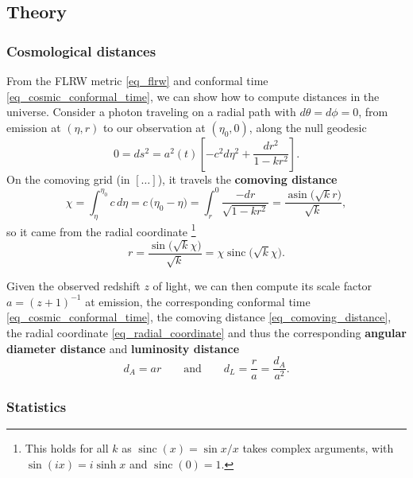 \documentclass[10pt,a4paper]{article}
\DeclareMathOperator{\asin}{asin}
\DeclareMathOperator{\sinc}{sinc}
\begin{document}
\subsection{Theory}

\subsubsection*{Cosmological distances}

From the FLRW metric \eqref{eq_flrw} and conformal time \eqref{eq_cosmic_conformal_time},
we can show how to compute distances in the universe.
Consider a photon traveling on a radial path with $d\theta = d\phi = 0$,
from emission at $(\eta,r)$ to our observation at $(\eta_0, 0)$,
along the null geodesic
\begin{equation*}
	0 = ds^2 = a^2(t) \left[ -c^2 d\eta^2 + \frac{dr^2}{1-kr^2} \right].
\end{equation*}
On the comoving grid (in $[\ldots]$), it travels the \textbf{comoving distance}
\begin{equation}
	\chi = \int_{\eta}^{\eta_0} c \, d\eta = c \, \big(\eta_0 - \eta\big) = \int_r^0 \frac{-dr}{\sqrt{1-kr^2}} = \frac{\asin\big(\sqrt{k}r\big)}{\sqrt{k}},
\label{eq_comoving_distance}
\end{equation}
so it came from the radial coordinate%
\footnote{This holds for all $k$ as $\sinc(x) = \sin x / x$ takes complex arguments, with $\sin(ix) = i \sinh x$ and $\sinc(0) = 1$.}
\begin{equation}
	r = \frac{\sin\Big(\sqrt{k}\chi\Big)}{\sqrt{k}} = \chi \sinc\Big(\sqrt{k}\chi\Big).
\label{eq_radial_coordinate}
\end{equation}

Given the observed redshift $z$ of light,
we can then compute its scale factor $a = (z+1)^{-1}$ at emission,
the corresponding conformal time \eqref{eq_cosmic_conformal_time},
the comoving distance \eqref{eq_comoving_distance}, the radial coordinate \eqref{eq_radial_coordinate}
and thus the corresponding \textbf{angular diameter distance} and \textbf{luminosity distance}
\begin{equation}
	d_A = a r
	\qquad \text{and} \qquad
	d_L = \frac{r}{a} = \frac{d_A}{a^2}.
\label{eq_distances}
\end{equation}

\subsubsection*{Statistics}
\end{document}
